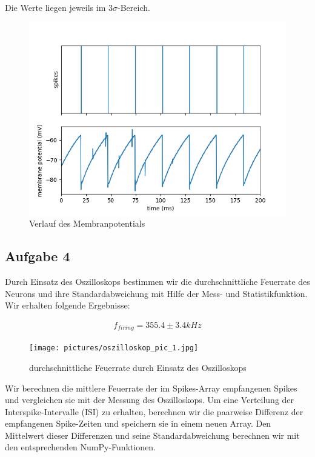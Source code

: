 \documentclass[10pt,a4paper]{scrartcl}
\begin{document}
\noindent Die Werte liegen jeweils im $3\sigma$-Bereich.
\begin{figure} [ht]
\label{fig:abb2}
\begin{center}
\caption{Verlauf des Membranpotentials}
\includegraphics[scale=0.5]{experiments/SingleNeuron/fp_task1_1membrane.png} 
\end{center}
\end{figure}


\subsection{Aufgabe 4}
Durch Einsatz des Oszilloskops bestimmen wir die durchschnittliche Feuerrate des Neurons und ihre Standardabweichung mit Hilfe der Mess- und Statistikfunktion. Wir erhalten folgende Ergebnisse: 

\begin{align*}
f_{firing} = 355.4 \pm 3.4 kHz
\end{align*}

\begin{figure} [ht]
\begin{center}
\label{fig:abb3}
\caption{durchschnittliche Feuerrate durch Einsatz des Oszilloskops}
\texttt{[image: pictures/oszilloskop\_pic\_1.jpg]} 
\end{center}
\end{figure}

\noindent Wir berechnen die mittlere Feuerrate der im Spikes-Array empfangenen Spikes und vergleichen sie mit der Messung des Oszilloskops. Um eine Verteilung der Interspike-Intervalle (ISI) zu erhalten, berechnen wir die paarweise Differenz der empfangenen Spike-Zeiten und speichern sie in einem neuen Array. Den
Mittelwert dieser Differenzen und seine Standardabweichung berechnen wir mit den
entsprechenden NumPy-Funktionen.
\end{document}
